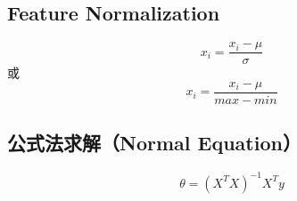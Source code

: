\subsection{Feature Normalization}
\begin{equation}
	x_i = \frac{x_i - \mu}{\sigma}
\end{equation}
或
\begin{equation}
	x_i = \frac{x_i - \mu}{max - min}
\end{equation}



\subsection{公式法求解（Normal Equation）}
\begin{equation}
	\theta = (X^T X)^{-1} X^T y
\end{equation}
















